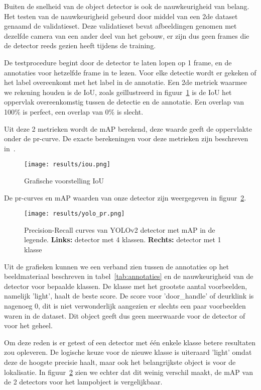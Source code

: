 Buiten de snelheid van de object detector is ook de nauwkeurigheid van belang.
Het testen van de nauwkeurigheid gebeurd door middel van een 2de dataset genaamd de validatieset. Deze validatieset bevat afbeeldingen genomen met dezelfde camera
van een ander deel van het gebouw, er zijn dus geen frames die de detector reeds gezien heeft tijdens de training.

De testprocedure begint door de detector te laten lopen op 1 frame, en de annotaties voor hetzelfde frame in te lezen.
Voor elke detectie wordt er gekeken of het label overeenkomt met het label in de annotatie.
Een 2de metriek waarmee we rekening houden is de \gls{IoU}, zoals ge\"{i}llustreerd in figuur~\ref{fig:iou} is de \gls{IoU}
het oppervlak overeenkomstig tussen de detectie en de annotatie.
Een overlap van 100\% is perfect, een overlap van 0\% is slecht.

Uit deze 2 metrieken wordt de \gls{mAP} berekend, deze waarde geeft de oppervlakte onder de pr-curve.
De exacte berekeningen voor deze metrieken zijn beschreven in~\cite{everingham2010pascal}.

\begin{figure}[h]
    \centering
    \texttt{[image: results/iou.png]}
    \caption{Grafische voorstelling IoU}
    \label{fig:iou}
\end{figure}

De pr-curves en \gls{mAP} waarden van onze detector zijn weergegeven in figuur~\ref{fig:yolo_pr}.

\begin{figure}[h]
    \texttt{[image: results/yolo\_pr.png]}
    \caption{Precision-Recall curves van YOLOv2 detector met mAP in de legende. \textbf{Links:} detector met 4 klassen. \textbf{Rechts:} detector met 1 klasse}
    \label{fig:yolo_pr}
\end{figure}

Uit de grafieken kunnen we een verband zien tussen de annotaties op het beeldmateriaal beschreven in tabel~\ref{tab:annotaties} en de nauwkeurigheid van
de detector voor bepaalde klassen. De klasse met het grootste aantal voorbeelden, namelijk 'light', haalt de beste score.
De score voor 'door\_handle' of deurklink is nagenoeg 0, dit is niet verwonderlijk aangezien er slechts een paar voorbeelden waren in de dataset.
Dit object geeft dus geen meerwaarde voor de detector of voor het geheel.

Om deze reden is er getest of een detector met \'{e}\'{e}n enkele klasse betere resultaten zou opleveren.
De logische keuze voor de nieuwe klasse is uiteraard 'light' omdat deze de hoogste precisie haalt, maar ook het belangrijkste object is voor de lokalisatie.
In figuur~\ref{fig:yolo_pr} zien we echter dat dit weinig verschil maakt, de \gls{mAP} van de 2 detectors voor het lampobject is vergelijkbaar.

